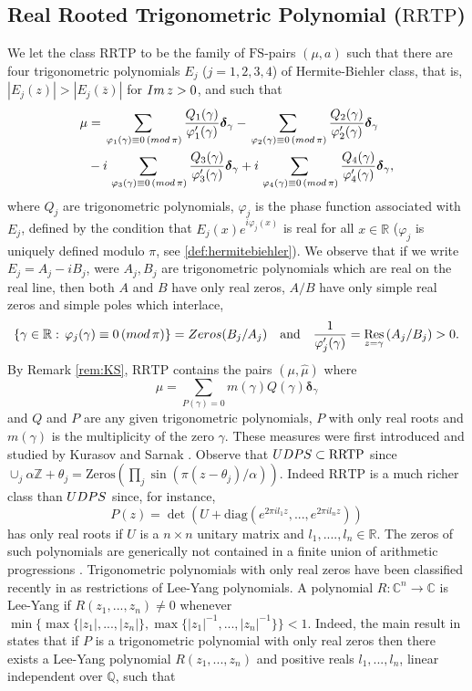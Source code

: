 \documentclass[a4paper,reqno,12pt]{amsart}
\newcommand{\z}{\mathbb{Z}}
\newcommand{\q}{\mathbb{Q}}
\renewcommand{\r}{\mathbb{R}}
\newcommand{\cp}{\mathbb{C}} %
\newcommand{\im}{{\rm Im}\,}
\newcommand{\ft}{\widehat}
\newcommand{\bo}{\boldsymbol}
\newcommand{\ga}{\gamma}
\newcommand{\al}{\alpha}
\newcommand{\p}{\varphi}
\newcommand{\1}{{\bf 1}}
\newcommand{\fs}{\mathrm{FS}}
\newcommand{\ov}[1]{\overline{#1}}
\newcommand{\udps}{{\rm UDPS}}
\newcommand{\rrtp}{\mathrm{RRTP}}
\renewcommand{\1}{{\bo 1}}
\newcommand{\del}{{\bo \delta}}
\newcommand{\res}[1]{ \mathop{\mathrm{Res}}_{z = #1}\,}
\begin{document}
\subsection{Real Rooted Trigonometric Polynomial ($\rrtp$)}
We let the class $\rrtp$ to be the family of $\fs$-pairs $(\mu,a)$ such that there are four trigonometric polynomials $E_j$ ($j=1,2,3,4$) of Hermite-Biehler class, that is, $|E_j(z)|>|E_j(\ov z)|$ for $\im z>0$, and such that
\begin{align*}
\mu &= \sum_{\, \p_1(\ga)\equiv 0 \,({\rm mod} \, \pi)} \frac{Q_1(\ga)}{\p_1'(\ga)} {\del}_{\ga}-\sum_{\, \p_2(\ga)\equiv 0 \,({\rm mod} \, \pi)} \frac{Q_2(\ga)}{\p_2'(\ga)} {\del}_{\ga} \\
& -  i\sum_{\, \p_3(\ga)\equiv 0 \,({\rm mod} \, \pi)} \frac{Q_3(\ga)}{\p_3'(\ga)} {\del}_{\ga}+i\sum_{\, \p_4(\ga)\equiv 0 \,({\rm mod} \, \pi)} \frac{Q_4(\ga)}{\p_4'(\ga)} {\del}_{\ga},
\end{align*}
where $Q_j$ are trigonometric polynomials, $\p_j$ is the phase function associated with $E_j$, defined by the condition that $E_j(x)e^{i\p_j(x)}$ is real for all $x\in \r$ ($\p_j$ is uniquely defined modulo $\pi$, see \eqref{def:hermitebiehler}). We observe that if we write $E_j=A_j-iB_j$, were $A_j,B_j$ are trigonometric polynomials which are real on the real line, then both $A$ and $B$ have only real zeros, $A/B$ have only simple real zeros and simple poles which interlace, 
 $$
\{\ga\in \r : \, \p_j(\ga)\equiv 0 \,({\rm mod} \, \pi)\} = {\rm Zeros}(B_j/A_j) \quad \text{and} \quad  \frac1{\p_j'(\ga)} = \res{\ga}(A_j/B_j)>0.
 $$
By Remark \ref{rem:KS}, $\rrtp$ contains the pairs $(\mu,\ft \mu)$ where
$$
\mu=\sum_{P(\ga)=0} m(\ga)Q(\ga)\del_{\ga}
$$
and $Q$ and $P$ are any given trigonometric polynomials, $P$ with only real roots and $m(\ga)$ is the multiplicity of the zero $\ga$. These measures were first introduced and studied by Kurasov and Sarnak \cite{KS}. Observe that $ \udps \subset \rrtp$ since $\cup_{j} \al \z + \theta_j=\text{Zeros}(\prod_j \sin(\pi(z-\theta_j)/\al))$. Indeed $\rrtp$ is a much richer class than $\udps$ since, for instance, $$P(z)=\det(U + \text{diag}(e^{2\pi i l_1 z},...,e^{2\pi i l_n z}))$$ has only real roots if $U$ is a $n\times n$ unitary matrix and $l_1,....,l_n \in \r$. The zeros of such polynomials are generically not contained in a finite union of arithmetic progressions \cite{AV}. Trigonometric polynomials with only real zeros have been classified recently in \cite{ACV} as restrictions of Lee-Yang polynomials. A polynomial $R:\cp^n\to\cp$ is Lee-Yang if $R(z_1,...,z_n)\neq 0$ whenever $\min\{\max\{|z_1|,...,|z_n|\},\max\{|z_1|^{-1},...,|z_n|^{-1}\}\}<1$.  Indeed, the main result in \cite{ACV} states that if $P$ is a trigonometric polynomial with only real zeros then there exists a Lee-Yang polynomial $R(z_1,...,z_n)$ and positive reals $l_1,...,l_n$, linear independent over $\q$, such that 
\end{document}

